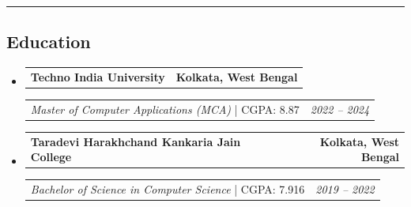 \documentclass[11pt,letterpaper]{article}
\makeatletter
\newcommand{\headerrow}[2]
{\begin{tabular*}{\linewidth}{l@{\extracolsep{\fill}}r}
#1 &
#2 \\
\end{tabular*}}
\makeatother
\begin{document}
\hrule
\vspace{-0.8em}

\subsection*{\Large Education}

\begin{itemize}[leftmargin=1em]

\item

\headerrow{\textbf{Techno India University}}{\textbf{Kolkata, West Bengal}}

\headerrow{\emph{Master of Computer Applications (MCA)} | CGPA: 8.87}{\emph{2022 – 2024}}

\item

\headerrow{\textbf{Taradevi Harakhchand Kankaria Jain College}}{\textbf{Kolkata, West Bengal}}

\headerrow{\emph{Bachelor of Science in Computer Science} | CGPA: 7.916}{\emph{2019 – 2022}}

\end{itemize}
\end{document}
